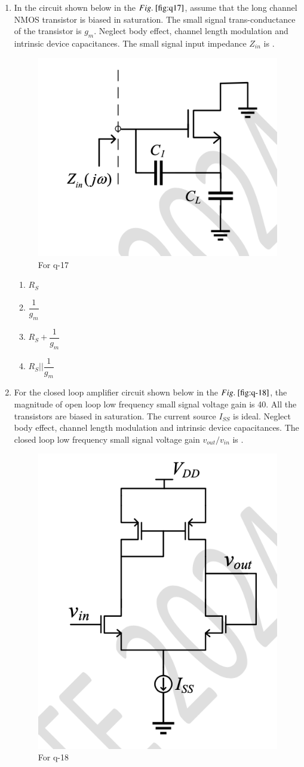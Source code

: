 \documentclass[journal,12pt,onecolumn]{IEEEtran}
\theoremstyle{remark}
\begin{document}
\begin{enumerate}
\item In the circuit shown below in the $\figref{fig:q17}$, assume that the long channel NMOS transistor is biased in saturation. The small signal trans-conductance of the transistor is $g_m$. Neglect body effect, channel length modulation and intrinsic device capacitances. The small signal input impedance $Z_{in}$ is \underline{\hspace{2cm}}.
\begin{figure}[H]
    \centering
    \includegraphics[width=0.4\columnwidth]{q17.png}
    \caption{For q-17}
    \label{fig:q17}
\end{figure}
\hfill{}
\begin{multicols}{4}
    \begin{enumerate}
    \item $R_S$
    \item $\dfrac{1}{g_m}$
    \item $R_S + \dfrac{1}{g_m}$
    \item $R_S || \dfrac{1}{g_m}$
\end{enumerate}
\end{multicols}


\item For the closed loop amplifier circuit shown below in the $\figref{fig:q-18}$, the magnitude of open loop low frequency small signal voltage gain is 40. All the transistors are biased in saturation. The current source $I_{SS}$ is ideal. Neglect body effect, channel length modulation and intrinsic device capacitances. The closed loop low frequency small signal voltage gain $v_{out}/v_{in}$  is \underline{\hspace{2cm}}.
\begin{figure}[H]
    \centering
    \includegraphics[width=0.3\columnwidth]{q18.png}
    \caption{For q-18}
    \label{fig:q18}
\end{figure}
\hfill{}


\end{enumerate}
\end{document}
